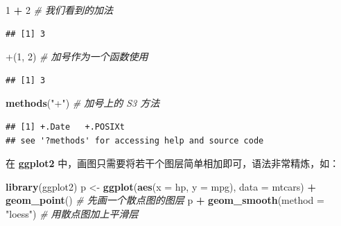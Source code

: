 \documentclass[
  b5paper,
  UTF8,twoside]{book}
\newenvironment{Shaded}{\begin{snugshade}}{\end{snugshade}}
\newcommand{\AttributeTok}[1]{\textcolor[rgb]{0.13,0.29,0.53}{#1}}
\newcommand{\CommentTok}[1]{\textcolor[rgb]{0.56,0.35,0.01}{\textit{#1}}}
\newcommand{\DecValTok}[1]{\textcolor[rgb]{0.00,0.00,0.81}{#1}}
\newcommand{\FunctionTok}[1]{\textcolor[rgb]{0.13,0.29,0.53}{\textbf{#1}}}
\newcommand{\NormalTok}[1]{#1}
\newcommand{\OtherTok}[1]{\textcolor[rgb]{0.56,0.35,0.01}{#1}}
\newcommand{\SpecialCharTok}[1]{\textcolor[rgb]{0.81,0.36,0.00}{\textbf{#1}}}
\newcommand{\StringTok}[1]{\textcolor[rgb]{0.31,0.60,0.02}{#1}}
\begin{document}
\begin{Shaded}
\begin{Highlighting}[]
\DecValTok{1} \SpecialCharTok{+} \DecValTok{2} \CommentTok{\# 我们看到的加法}
\end{Highlighting}
\end{Shaded}

\begin{verbatim}
## [1] 3
\end{verbatim}

\begin{Shaded}
\begin{Highlighting}[]
\StringTok{\textasciigrave{}}\AttributeTok{+}\StringTok{\textasciigrave{}}\NormalTok{(}\DecValTok{1}\NormalTok{, }\DecValTok{2}\NormalTok{) }\CommentTok{\# 加号作为一个函数使用}
\end{Highlighting}
\end{Shaded}

\begin{verbatim}
## [1] 3
\end{verbatim}

\begin{Shaded}
\begin{Highlighting}[]
\FunctionTok{methods}\NormalTok{(}\StringTok{"+"}\NormalTok{) }\CommentTok{\# 加号上的 S3 方法}
\end{Highlighting}
\end{Shaded}

\begin{verbatim}
## [1] +.Date   +.POSIXt
## see '?methods' for accessing help and source code
\end{verbatim}

在 \textbf{ggplot2} 中，画图只需要将若干个图层简单相加即可，语法非常精炼，如：

\begin{Shaded}
\begin{Highlighting}[]
\FunctionTok{library}\NormalTok{(ggplot2)}
\NormalTok{p }\OtherTok{\textless{}{-}} \FunctionTok{ggplot}\NormalTok{(}\FunctionTok{aes}\NormalTok{(}\AttributeTok{x =}\NormalTok{ hp, }\AttributeTok{y =}\NormalTok{ mpg), }\AttributeTok{data =}\NormalTok{ mtcars) }\SpecialCharTok{+}
  \FunctionTok{geom\_point}\NormalTok{() }\CommentTok{\# 先画一个散点图的图层}
\NormalTok{p }\SpecialCharTok{+} \FunctionTok{geom\_smooth}\NormalTok{(}\AttributeTok{method =} \StringTok{"loess"}\NormalTok{) }\CommentTok{\# 用散点图加上平滑层}
\end{Highlighting}
\end{Shaded}
\end{document}
